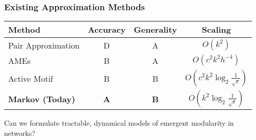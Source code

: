 \documentclass{beamer}
\begin{document}
		
		\begin{frame}\frametitle{Existing Approximation Methods}

			\begin{tabular}{l | c | c | c }
				Method & Accuracy & Generality &  Scaling \\ 
				\hline
				Pair Approximation\footnotemark & D & A &$O(k^2)$ \\ 
				AMEs\footnotemark[\value{footnote}]\footnotetext{\tiny{\fullcite{Durrett2012}}} 
				& B & A & $O(c^2 k^2 h^{-4})$ \\ 
				Active Motif\footfullcite{Demirel2012} & B & B & $O(c^2k^2\log_2\frac{1}{\sqrt{\epsilon}})$\\ 
				\textbf{Markov (Today)} & \textbf{A} & \textbf{B} & $O(k^2\log_2\frac{1}{\sqrt{\epsilon}})$
			\end{tabular}


		\end{frame}
	
		\begin{frame}[standout]
			Can we formulate \alert{tractable}, \alert{dynamical} models of emergent modularity in networks?
		\end{frame}
		
\end{document}
